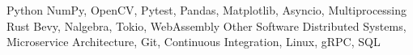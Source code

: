 \begin{cvskills}
    \cvskill
       {Python}
       {NumPy, OpenCV, Pytest, Pandas, Matplotlib, Asyncio, Multiprocessing}
    \cvskill
       {Rust}
       {Bevy, Nalgebra, Tokio, WebAssembly}
    \cvskill
       {Other Software}
       {Distributed Systems, Microservice Architecture, Git, Continuous Integration, Linux, gRPC, SQL}
\end{cvskills}

